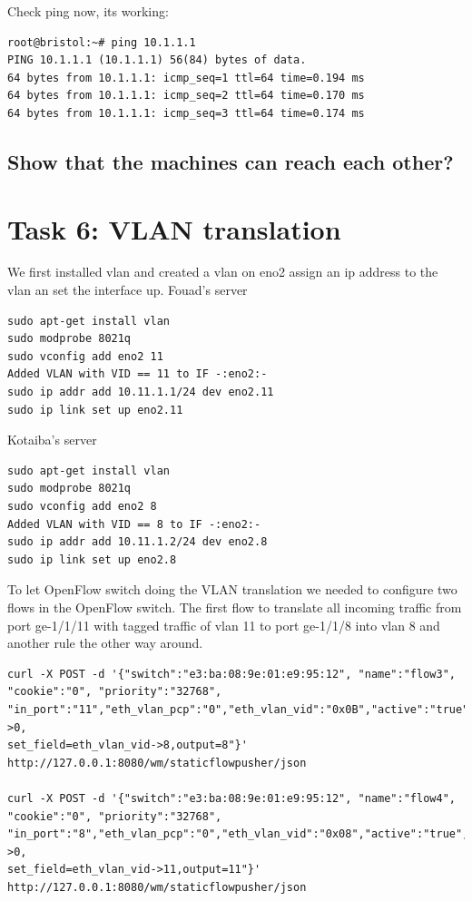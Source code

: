 \documentclass[a4paper]{article}
\begin{document}
Check ping now, its working:
\begin{verbatim}
root@bristol:~# ping 10.1.1.1
PING 10.1.1.1 (10.1.1.1) 56(84) bytes of data.
64 bytes from 10.1.1.1: icmp_seq=1 ttl=64 time=0.194 ms
64 bytes from 10.1.1.1: icmp_seq=2 ttl=64 time=0.170 ms
64 bytes from 10.1.1.1: icmp_seq=3 ttl=64 time=0.174 ms
\end{verbatim}

\subsection{Show that the machines can reach each other?}


\section{Task 6: VLAN translation}
\label{sec:task3}
We first installed vlan and created a vlan on eno2 assign an ip address to the vlan an set the interface up.
Fouad's server
\begin{verbatim}
sudo apt-get install vlan
sudo modprobe 8021q
sudo vconfig add eno2 11
Added VLAN with VID == 11 to IF -:eno2:-
sudo ip addr add 10.11.1.1/24 dev eno2.11
sudo ip link set up eno2.11
\end{verbatim}

Kotaiba's server
\begin{verbatim}
sudo apt-get install vlan
sudo modprobe 8021q
sudo vconfig add eno2 8
Added VLAN with VID == 8 to IF -:eno2:-
sudo ip addr add 10.11.1.2/24 dev eno2.8
sudo ip link set up eno2.8 
\end{verbatim}
\noindent
To let OpenFlow switch doing the VLAN translation we needed to configure two flows in the OpenFlow switch. The first flow to translate all incoming traffic from port ge-1/1/11 with tagged traffic of vlan 11 to port ge-1/1/8 into vlan 8 and another rule the other way around.

\begin{verbatim}
curl -X POST -d '{"switch":"e3:ba:08:9e:01:e9:95:12", "name":"flow3", "cookie":"0", "priority":"32768", 
"in_port":"11","eth_vlan_pcp":"0","eth_vlan_vid":"0x0B","active":"true","actions":"set_field=eth_vlan_pcp->0,
set_field=eth_vlan_vid->8,output=8"}' http://127.0.0.1:8080/wm/staticflowpusher/json

curl -X POST -d '{"switch":"e3:ba:08:9e:01:e9:95:12", "name":"flow4", "cookie":"0", "priority":"32768", 
"in_port":"8","eth_vlan_pcp":"0","eth_vlan_vid":"0x08","active":"true","actions":"set_field=eth_vlan_pcp->0,
set_field=eth_vlan_vid->11,output=11"}' http://127.0.0.1:8080/wm/staticflowpusher/json
\end{verbatim}
\end{document}
